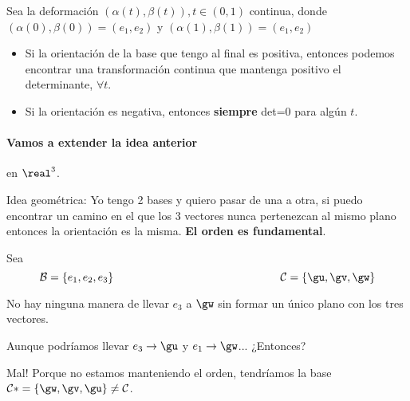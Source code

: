 Sea la deformación $(\alpha(t),\beta(t)), t\in(0,1)$ continua, donde $(\alpha(0),\beta(0)) = (e_1,e_2)$ y $(\alpha(1),\beta(1)) = (e_1,e_2)$

\begin{itemize}
\item
Si la orientación de la base que tengo al final es positiva, entonces podemos encontrar una transformación continua que mantenga positivo el determinante, $\forall t$. 
\item
Si la orientación es negativa, entonces \textbf{siempre} det=0 para algún $t$.
\end{itemize}

\paragraph{Vamos a extender la idea anterior} en $\real^3$.

Idea geométrica: Yo tengo 2 bases y quiero pasar de una a otra, si puedo encontrar un camino en el que los 3 vectores nunca pertenezcan al mismo plano entonces la orientación es la misma. \textbf{El orden es fundamental}. 

Sea 
\[\mathcal{B} = \{e_1,e_2,e_3\} \hspace*{150pt} \mathcal{C} = \{\gu,\gv,\gw\}\]

\begin{preview}
\hspace*{50pt}
\hspace*{100pt}
\end{preview}

No hay ninguna manera de llevar $e_3$ a $\gw$ sin formar un único plano con los tres vectores. 

Aunque podríamos llevar $e_3 \to \gu$ y $e_1 \to \gw$... ¿Entonces?

Mal! Porque no estamos manteniendo el orden, tendríamos la base $\mathcal{C}* = \{\gw,\gv,\gu\}\neq\mathcal{C}$.

